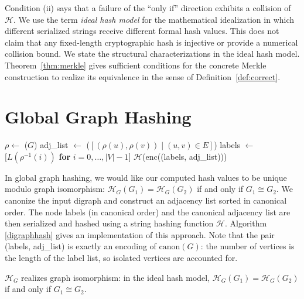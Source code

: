 \documentclass[twoside,leqno]{article}
\newcommand{\HG}{\mathcal{H}_{G}}
\newcommand{\enc}{\mathrm{enc}}
\newcommand{\canon}{\mathrm{canon}}
\newcommand{\iso}{\cong}
\begin{document}
Condition (ii) says that a failure of the ``only if'' direction exhibits a collision of $\mathcal{H}$. We use the term \emph{ideal hash model} for the mathematical idealization in which different serialized strings receive different formal hash values. This does not claim that any fixed-length cryptographic hash is injective or provide a numerical collision bound. We state the structural characterizations in the ideal hash model. Theorem~\ref{thm:merkle} gives sufficient conditions for the concrete Merkle construction to realize its equivalence in the sense of Definition~\ref{def:correct}.

\section{Global Graph Hashing}
\label{sec:global-graph-hashing}

\begin{algorithm}[b]
    \caption{Global Digraph Hash}\label{digraphhash}
    \begin{algorithmic}[1]
    \Function{$\HG$}{$G=(V,E,L)$}
        \State $\rho \gets$ ($G$) 
        \State adj\_list $\gets$ ($[(\rho(u), \rho(v)) \mid (u,v) \in E]$)
        \State labels $\gets$ $[L(\rho^{-1}(i))$ \textbf{for} $i = 0, \dots, |V|-1]$
        \State \Return $\mathcal{H}$($\enc$((labels, adj\_list)))
    \EndFunction
    \end{algorithmic}
\end{algorithm}

In global graph hashing, we would like our computed hash values to be unique modulo graph isomorphism: $\HG(G_1)=\HG(G_2)$ if and only if $G_1 \iso G_2$. We canonize the input digraph and construct an adjacency list sorted in canonical order. The node labels (in canonical order) and the canonical adjacency list are then serialized and hashed using a string hashing function $\mathcal{H}$. Algorithm \ref{digraphhash} gives an implementation of this approach. Note that the pair (labels, adj\_list) is exactly an encoding of $\canon(G)$: the number of vertices is the length of the label list, so isolated vertices are accounted for.

\begin{theorem}
\label{thm:digraphhashcorrect}
$\HG$ realizes graph isomorphism: in the ideal hash model, $\HG(G_1)=\HG(G_2)$ if and only if $G_1 \iso G_2$.
\end{theorem}
\end{document}
